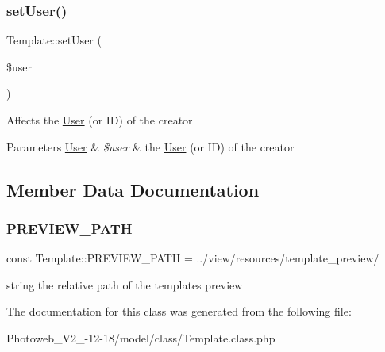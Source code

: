 \subsubsection{\texorpdfstring{set\+User()}{setUser()}}
{\footnotesize\ttfamily Template\+::set\+User (\begin{DoxyParamCaption}\item[{}]{\$user }\end{DoxyParamCaption})}

Affects the \hyperlink{classUser}{User} (or ID) of the creator 
\begin{DoxyParams}[1]{Parameters}
\hyperlink{classUser}{User} & {\em \$user} & the \hyperlink{classUser}{User} (or ID) of the creator \\
\hline
\end{DoxyParams}


\subsection{Member Data Documentation}
\mbox{\label{classTemplate_a0fa014aee55ffb6680347e2786c31858}} 
\subsubsection{\texorpdfstring{P\+R\+E\+V\+I\+E\+W\+\_\+\+P\+A\+TH}{PREVIEW\_PATH}}
{\footnotesize\ttfamily const Template\+::\+P\+R\+E\+V\+I\+E\+W\+\_\+\+P\+A\+TH = \textquotesingle{}../view/resources/template\+\_\+preview/\textquotesingle{}}

string the relative path of the template\textquotesingle{}s preview 

The documentation for this class was generated from the following file\+:\begin{DoxyCompactItemize}
\item 
Photoweb\+\_\+\+V2\+\_-\/12-\/18/model/class/Template.\+class.\+php\end{DoxyCompactItemize}
